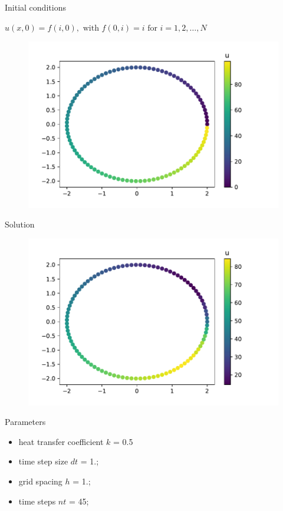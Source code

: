 \documentclass[\classoption]{beamer}
\begin{document}
\begin{frame}{Initial conditions}

\begin{center}
$u(x,0) = f(i,0), \text{ with } f(0,i)=i \text{ for } i=1,2,\ldots,N$
\end{center}

\begin{figure}
\includegraphics[scale=0.5]{./images/initial_conditons.pdf}
\end{figure}

\end{frame}

\begin{frame}{Solution}
\vspace{-0.5cm}
\begin{figure}
\includegraphics[scale=0.5]{./images/solution.pdf}
\end{figure}
\vspace{-0.5cm}
\begin{block}{Parameters}
\begin{itemize}
\item heat transfer coefficient $k$ = 0.5
\item time step size $dt$ = 1.;
\item grid spacing $h$ = 1.;
\item time steps $nt$ = 45;
\end{itemize}

\end{block}

\end{frame}
\end{document}
